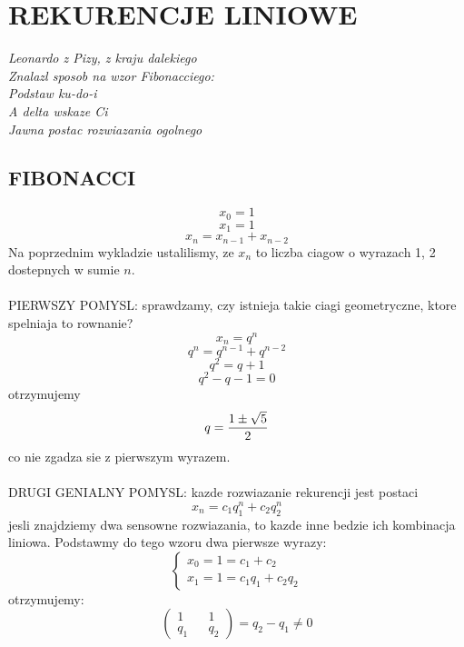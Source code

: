 \documentclass{article}
\begin{document}
\ttfamily
\section*{REKURENCJE LINIOWE}
\begin{center}
    \emph{\color{acc}Leonardo z Pizy, z kraju dalekiego\\Znalazl sposob na wzor Fibonacciego:\\Podstaw ku-do-i\\A delta wskaze Ci\\Jawna postac rozwiazania ogolnego}
\end{center}
\subsection*{FIBONACCI}
    $$x_0=1$$
    $$x_1=1$$
    $$x_n=x_{n-1}+x_{n-2}$$
    Na poprzednim wykladzie ustalilismy, ze $x_n$ to liczba ciagow o wyrazach 1, 2 dostepnych w sumie $n$.\bigskip\\
    \bigskip\\
    {\large\color{emp}PIERWSZY POMYSL}: sprawdzamy, czy istnieja takie ciagi geometryczne, ktore spelniaja to rownanie?
    $$x_n=q^n$$
    $$q^n=q^{n-1}+q^{n-2}$$
    $$q^2=q+1$$
    $$q^2-q-1=0$$
    otrzymujemy
    $$q={1\pm \sqrt{5}\over2}$$
    co nie zgadza sie z pierwszym wyrazem.\bigskip\\
    \bigskip\\
    {\color{emp}\large DRUGI GENIALNY POMYSL}: kazde rozwiazanie rekurencji jest postaci
    $$x_n=c_1q_1^n+c_2q_2^n$$
    jesli znajdziemy dwa sensowne rozwiazania, to kazde inne bedzie ich kombinacja liniowa. Podstawmy do tego wzoru dwa pierwsze wyrazy:
    $$\begin{cases}x_0=1=c_1+c_2\\x_1=1=c_1q_1+c_2q_2\end{cases}$$
    otrzymujemy:
    $$\begin{pmatrix}1&&1\\q_1&&q_2\end{pmatrix}=q_2-q_1\neq 0$$
\end{document}
